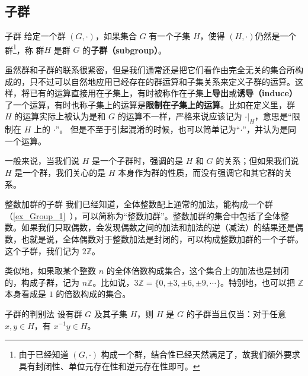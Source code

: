 

\subsection{子群}

\begin{definition}{子群}
给定一个群 $(G, \cdot)$，如果集合 $G$ 有一个子集 $H$，使得 $(H, \cdot)$仍然是一个群\footnote{由于已经知道 $(G,\cdot)$ 构成一个群，结合性已经天然满足了，故我们额外要求具有封闭性、单位元存在性和逆元存在性即可。}，称 群$H$ 是群 $G$ 的\textbf{子群（subgroup）}。
\end{definition}

虽然群和子群的联系很紧密，但是我们通常还是把它们看作由完全无关的集合所构成的，只不过可以自然地应用已经存在的群运算和子集关系来定义子群的运算。这样，将已有的运算直接用在子集上，有时被称作在子集上\textbf{导出}或\textbf{诱导（induce）}了一个运算，有时也称子集上的运算是\textbf{限制在子集上的运算}。比如在定义里，群 $H$ 的运算实际上被认为是和 $G$ 的运算不一样，严格来说应该记为 $\cdot|_H$，意思是“限制在 $H$ 上的 $\cdot$”。 但是不至于引起混淆的时候，也可以简单记为“$\cdot$”，并认为是同一个运算。

一般来说，当我们说 $H$ 是一个子群时，强调的是 $H$ 和 $G$ 的关系；但如果我们说 $H$ 是一个群，我们关心的是 $H$ 本身作为群的性质，而没有强调它和其它群的关系。

\begin{example}{整数加群的子群}\label{ex_Group1_1}
我们已经知道，全体整数配上通常的加法，能构成一个群（\autoref{ex_Group_1}~），可以简称为“整数加群”。整数加群的集合中包括了全体整数。如果我们只取偶数，会发现偶数之间的加法和加法的逆（减法）的结果还是偶数，也就是说，全体偶数对于整数加法是封闭的，可以构成整数加群的一个子群。这个子群，我们记为 $2\mathbb{Z}$。

类似地，如果取某个整数 $n$ 的全体倍数构成集合，这个集合上的加法也是封闭的，构成子群，记为 $n\mathbb{Z}$。比如说，$3\mathbb{Z}=\{0, \pm3, \pm6, \pm9, \cdots\}$。特别地，也可以把 $\mathbb{Z}$ 本身看成是 $1$ 的倍数构成的集合。
\end{example}

\begin{theorem}{子群的判别法}\label{the_Group1_3}
设有群 $G$ 及其子集 $H$，则 $H$ 是 $G$ 的子群当且仅当：对于任意 $x, y\in H$，有 $x^{-1}y\in H$。
\end{theorem}

